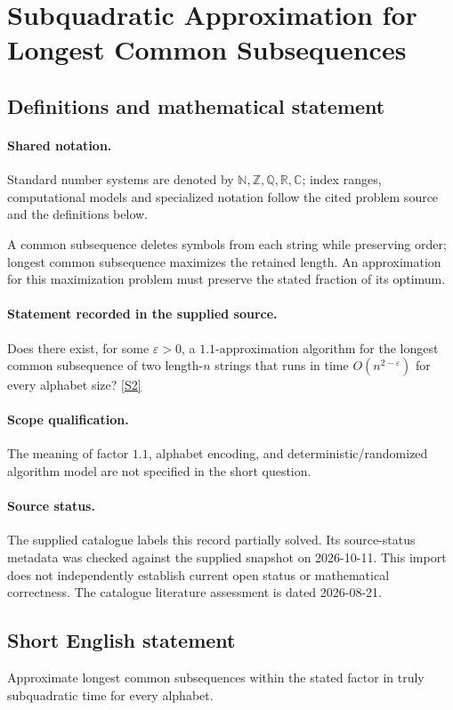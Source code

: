 \documentclass[11pt]{article}
\newcommand{\sref}[2]{\hyperlink{source:#1:#2}{[S#2]}}
\begin{document}
\section{Subquadratic Approximation for Longest Common Subsequences}\label{statement}

\subsection{Definitions and mathematical statement}

\paragraph{Shared notation.}Standard number systems are denoted by $\mathbb N,\mathbb Z,\mathbb Q,\mathbb R,\mathbb C$; index ranges, computational models and specialized notation follow the cited problem source and the definitions below.


A common subsequence deletes symbols from each string while preserving order; longest common subsequence maximizes the retained length. An approximation for this maximization problem must preserve the stated fraction of its optimum.
\paragraph{Statement recorded in the supplied source.}
Does there exist, for some $\varepsilon>0$, a $1.1$-approximation algorithm for the longest common subsequence of two length-$n$ strings that runs in time $O(n^{2-\varepsilon})$ for every alphabet size? \sref{statement}{2}
\paragraph{Scope qualification.}
The meaning of factor $1.1$, alphabet encoding, and deterministic/randomized algorithm model are not specified in the short question.
\paragraph{Source status.}
The supplied catalogue labels this record partially solved. Its source-status metadata was checked against the supplied snapshot on 2026-10-11. This import does not independently establish current open status or mathematical correctness. The catalogue literature assessment is dated 2026-08-21.
\subsection{Short English statement}
Approximate longest common subsequences within the stated factor in truly subquadratic time for every alphabet.
\end{document}
